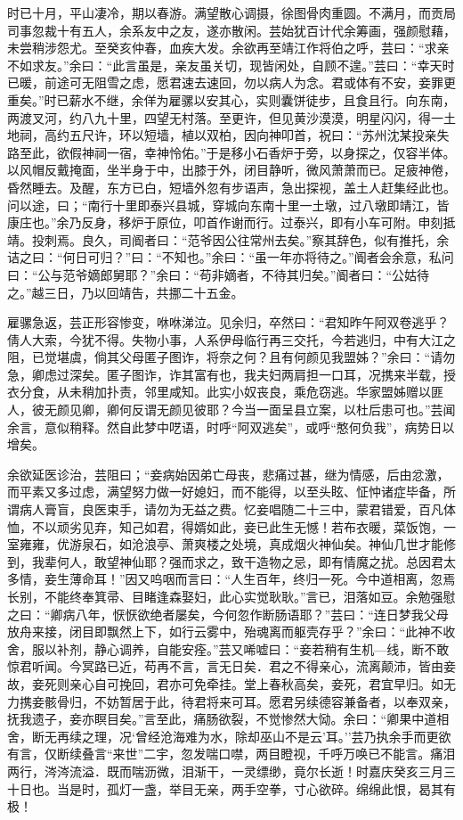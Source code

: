 \documentclass[]{article}
\begin{document}
时已十月，平山凄冷，期以春游。满望散心调摄，徐图骨肉重圆。不满月，而贡局司事忽裁十有五人，余系友中之友，遂亦散闲。芸始犹百计代余筹画，强颜慰藉，未尝稍涉怨尤。至癸亥仲春，血疾大发。余欲再至靖江作将伯之呼，芸曰：``求亲不如求友。''余曰：``此言虽是，亲友虽关切，现皆闲处，自顾不遑。''芸曰：``幸天时已暖，前途可无阻雪之虑，愿君速去速回，勿以病人为念。君或体有不安，妾罪更重矣。''时已薪水不继，余佯为雇骡以安其心，实则囊饼徒步，且食且行。向东南，两渡叉河，约八九十里，四望无村落。至更许，但见黄沙漠漠，明星闪闪，得一土地祠，高约五尺许，环以短墙，植以双柏，因向神叩首，祝曰：``苏州沈某投亲失路至此，欲假神祠一宿，幸神怜佑。''于是移小石香炉于旁，以身探之，仅容半体。以风帽反戴掩面，坐半身于中，出膝于外，闭目静听，微风萧萧而已。足疲神倦，昏然睡去。及醒，东方已白，短墙外忽有步语声，急出探视，盖土人赶集经此也。问以途，曰；``南行十里即泰兴县城，穿城向东南十里一土墩，过八墩即靖江，皆康庄也。''余乃反身，移炉于原位，叩首作谢而行。过泰兴，即有小车可附。申刻抵靖。投刺焉。良久，司阍者曰：``范爷因公往常州去矣。''察其辞色，似有推托，余诘之曰：``何日可归？''曰：``不知也。''余曰：``虽一年亦将待之。''阍者会余意，私问曰：``公与范爷嫡郎舅耶？''余曰：``苟非嫡者，不待其归矣。''阍者曰：``公姑待之。''越三日，乃以回靖告，共挪二十五金。

雇骡急返，芸正形容惨变，咻咻涕泣。见余归，卒然曰：``君知昨午阿双卷逃乎？倩人大索，今犹不得。失物小事，人系伊母临行再三交托，今若逃归，中有大江之阻，已觉堪虞，倘其父母匿子图诈，将奈之何？且有何颜见我盟姊？''余曰：``请勿急，卿虑过深矣。匿子图诈，诈其富有也，我夫妇两肩担一口耳，况携来半载，授衣分食，从未稍加扑责，邻里咸知。此实小奴丧良，乘危窃逃。华家盟姊赠以匪人，彼无颜见卿，卿何反谓无颜见彼耶？今当一面呈县立案，以杜后患可也。''芸闻余言，意似稍释。然自此梦中呓语，时呼``阿双逃矣''，或呼``憨何负我''，病势日以增矣。

余欲延医诊治，芸阻曰；``妾病始因弟亡母丧，悲痛过甚，继为情感，后由忿激，而平素又多过虑，满望努力做一好媳妇，而不能得，以至头眩、怔忡诸症毕备，所谓病人膏盲，良医束手，请勿为无益之费。忆妾唱随二十三中，蒙君错爱，百凡体恤，不以顽劣见弃，知己如君，得婿如此，妾已此生无憾！若布衣暖，菜饭饱，一室雍雍，优游泉石，如沧浪亭、萧爽楼之处境，真成烟火神仙矣。神仙几世才能修到，我辈何人，敢望神仙耶？强而求之，致干造物之忌，即有情魔之扰。总因君太多情，妾生薄命耳！''因又呜咽而言曰：``人生百年，终归一死。今中道相离，忽焉长别，不能终奉箕帚、目睹逢森娶妇，此心实觉耿耿。''言已，泪落如豆。余勉强慰之曰：``卿病八年，恹恹欲绝者屡矣，今何忽作断肠语耶？''芸曰：``连日梦我父母放舟来接，闭目即飘然上下，如行云雾中，殆魂离而躯壳存乎？''余曰：``此神不收舍，服以补剂，静心调养，自能安痊。''芸又唏嘘曰：``妾若稍有生机---线，断不敢惊君听闻。今冥路已近，苟再不言，言无日矣．君之不得亲心，流离颠沛，皆由妾故，妾死则亲心自可挽回，君亦可免牵挂。堂上春秋高矣，妾死，君宜早归。如无力携妾骸骨归，不妨暂居于此，待君将来可耳。愿君另续德容兼备者，以奉双亲，抚我遗子，妾亦瞑目矣。''言至此，痛肠欲裂，不觉惨然大恸。余曰：``卿果中道相舍，断无再续之理，况`曾经沧海难为水，除却巫山不是云'耳。''芸乃执余手而更欲有言，仅断续叠言``来世''二宇，忽发喘口噤，两目瞪视，千呼万唤已不能言。痛泪两行，涔涔流溢．既而喘沥微，泪渐干，一灵缥缈，竟尔长逝！时嘉庆癸亥三月三十日也。当是时，孤灯一盏，举目无亲，两手空拳，寸心欲碎。绵绵此恨，曷其有极！
\end{document}
